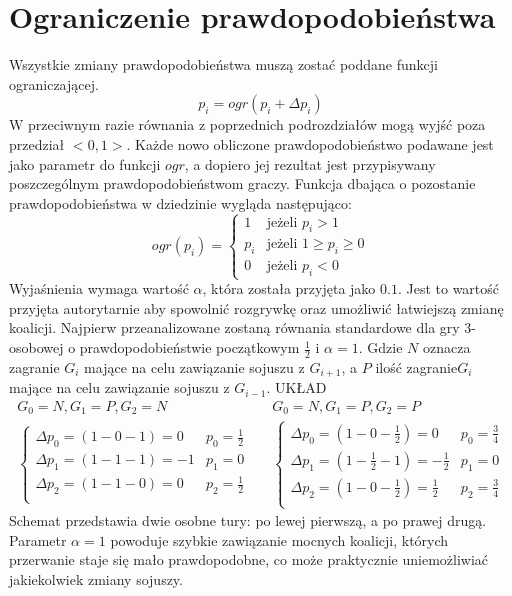 \section{Ograniczenie prawdopodobieństwa}
\label{sec:ograniczenie}
Wszystkie zmiany prawdopodobieństwa muszą zostać poddane funkcji ograniczającej.
\begin{equation} \label{eq:ograniczenie}
p_i = ogr( p_i + \Delta p_i)
\end{equation}
W przeciwnym razie równania z poprzednich podrozdziałów mogą wyjść poza przedział $<0,1>$. Każde nowo obliczone prawdopodobieństwo podawane jest jako parametr do funkcji $ogr$, a dopiero jej rezultat jest przypisywany poszczególnym prawdopodobieństwom graczy. Funkcja dbająca o pozostanie prawdopodobieństwa w dziedzinie wygląda następująco:
\begin{displaymath}
ogr(p_i) = \left\{
\begin{array}{ll}
1 & \text{jeżeli } p_i > 1 \\
p_i & \text{jeżeli } 1 \geq p_i \geq 0 \\
0 & \text{jeżeli } p_i < 0
\end{array} 
\right.
\end{displaymath}
Wyjaśnienia wymaga wartość $\alpha$, która została przyjęta jako $0.1$. Jest to wartość przyjęta autorytarnie aby spowolnić rozgrywkę oraz umożliwić łatwiejszą zmianę koalicji. Najpierw przeanalizowane zostaną równania standardowe dla gry 3-osobowej o prawdopodobieństwie początkowym $\frac{1}{2}$ i $\alpha = 1$. Gdzie $N$ oznacza zagranie $G_i$ mające na celu zawiązanie sojuszu z $G_{i+1}$, a $P$ ilość zagranie$G_i$ mające na celu zawiązanie sojuszu z $G_{i-1}$.
{\color{red} UKŁAD}
\begin{align*}
G_0 = N, G_1 = P, G_2 = N && G_0 = N, G_1 = P, G_2 = P\\
\left\{
\begin{array}{cc}
\Delta p_0 = (1 - 0 - 1) =  0 & p_0=\frac{1}{2}\\
\Delta p_1 = (1 - 1 - 1) =  -1 & p_1= 0\\
\Delta p_2 = (1 - 1 - 0) =  0 & p_2=\frac{1}{2}\\
\end{array} 
\right. &&
\left\{
\begin{array}{cc}
\Delta p_0 = (1 - 0 - \frac{1}{2}) =  0 & p_0=\frac{3}{4}\\
\Delta p_1 = (1 - \frac{1}{2} - 1) =  -\frac{1}{2} & p_1= 0\\
\Delta p_2 = (1 - 0 - \frac{1}{2}) =  \frac{1}{2} & p_2=\frac{3}{4}\\
\end{array}
\right.
\end{align*}
Schemat przedstawia dwie osobne tury: po lewej pierwszą, a po prawej drugą. Parametr $\alpha=1$ powoduje szybkie zawiązanie mocnych koalicji, których przerwanie staje się mało prawdopodobne, co może praktycznie uniemożliwiać jakiekolwiek zmiany sojuszy.

